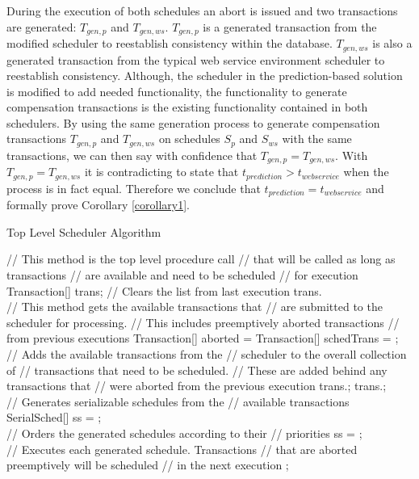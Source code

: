 \documentclass[conference]{IEEEtran}
\begin{document}
During the execution of both schedules an abort is issued and two transactions are generated: $T_{gen,p}$ and $T_{gen,ws}$. $T_{gen,p}$ is a generated transaction from the modified scheduler to reestablish consistency within the database. $T_{gen,ws}$ is also a generated transaction from the typical web service environment scheduler to reestablish consistency. Although, the scheduler in the prediction-based solution is modified to add needed functionality, the functionality to generate compensation transactions is the existing functionality contained in both schedulers. By using the same generation process to generate compensation transactions $T_{gen,p}$ and $T_{gen,ws}$ on schedules $S_{p}$ and $S_{ws}$ with the same transactions, we can then say with confidence that $T_{gen,p} = T_{gen,ws}$. With $T_{gen,p} = T_{gen,ws}$ it is contradicting to state that $t_{prediction} > t_{web service}$ when the process is in fact equal. Therefore we conclude that $t_{prediction} = t_{web service}$ and formally prove Corollary \ref{corollary1}.

\begin{algorithm}
\caption{Top Level Scheduler Algorithm}
\label{alg:top_level}
\begin{algorithmic}[1]

  \State // This method is the top level procedure call
  \State // that will be called as long as transactions
  \State // are available and need to be scheduled
  \State // for execution
  \\
  \State Transaction[] trans;
    \State // Clears the list from last execution
    \State trans.
    \\
    \State // This method gets the available transactions that
    \State // are submitted to the scheduler for processing.
    \State // This includes preemptively aborted transactions
    \State // from previous executions
    \State Transaction[] aborted = 
    \State Transaction[] schedTrans = ;
    \\
    \State // Adds the available transactions from the
    \State // scheduler to the overall collection of
    \State // transactions that need to be scheduled. 
    \State // These are added behind any transactions that
    \State // were aborted from the previous execution
    \State trans.;
    \State trans.;
    \\
    \State // Generates serializable schedules from the 
    \State // available transactions
    \State SerialSched[] ss = ;
    \\
    \State // Orders the generated schedules according to their
    \State // priorities
    \State ss = ;
    \\
    \State // Executes each generated schedule. Transactions
    \State // that are aborted preemptively will be scheduled
    \State // in the next execution
      \State {};
    \EndFor
  \EndWhile
\EndProcedure

\end{algorithmic}
\end{algorithm}
\end{document}
